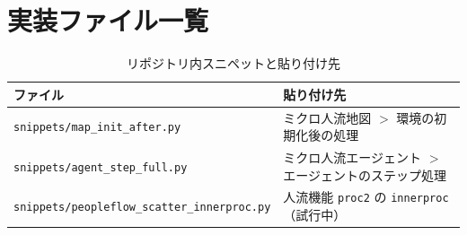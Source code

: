 \documentclass[11pt,a4paper]{ltjsarticle}
\begin{document}
\appendix
\section{実装ファイル一覧}

\begin{table}[H]
  \centering
  \caption{リポジトリ内スニペットと貼り付け先}
  \begin{tabular}{ll}
    \toprule
    ファイル & 貼り付け先 \\
    \midrule
    \texttt{snippets/map\_init\_after.py} & ミクロ人流地図 $>$ 環境の初期化後の処理 \\
    \texttt{snippets/agent\_step\_full.py} & ミクロ人流エージェント $>$ エージェントのステップ処理 \\
    \texttt{snippets/peopleflow\_scatter\_innerproc.py} &
      人流機能 \texttt{proc2} の \texttt{innerproc}（試行中） \\
    \bottomrule
  \end{tabular}
\end{table}
\end{document}
